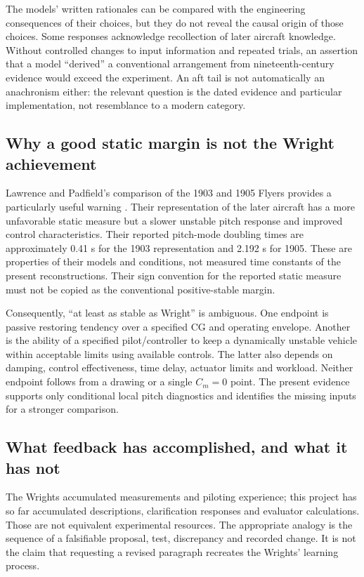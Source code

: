 \documentclass[11pt,a4paper]{article}
\begin{document}
The models' written rationales can be compared with the engineering consequences of their choices, but they do not reveal the causal origin of those choices. Some responses acknowledge recollection of later aircraft knowledge. Without controlled changes to input information and repeated trials, an assertion that a model ``derived'' a conventional arrangement from nineteenth-century evidence would exceed the experiment. An aft tail is not automatically an anachronism either: the relevant question is the dated evidence and particular implementation, not resemblance to a modern category.

\subsection{Why a good static margin is not the Wright achievement}
Lawrence and Padfield's comparison of the 1903 and 1905 Flyers provides a particularly useful warning \cite{ref10}. Their representation of the later aircraft has a more unfavorable static measure but a slower unstable pitch response and improved control characteristics. Their reported pitch-mode doubling times are approximately 0.41 s for the 1903 representation and 2.192 s for 1905. These are properties of their models and conditions, not measured time constants of the present reconstructions. Their sign convention for the reported static measure must not be copied as the conventional positive-stable margin.

Consequently, ``at least as stable as Wright'' is ambiguous. One endpoint is passive restoring tendency over a specified CG and operating envelope. Another is the ability of a specified pilot/controller to keep a dynamically unstable vehicle within acceptable limits using available controls. The latter also depends on damping, control effectiveness, time delay, actuator limits and workload. Neither endpoint follows from a drawing or a single $C_m=0$ point. The present evidence supports only conditional local pitch diagnostics and identifies the missing inputs for a stronger comparison.

\subsection{What feedback has accomplished, and what it has not}
The Wrights accumulated measurements and piloting experience; this project has so far accumulated descriptions, clarification responses and evaluator calculations. Those are not equivalent experimental resources. The appropriate analogy is the sequence of a falsifiable proposal, test, discrepancy and recorded change. It is not the claim that requesting a revised paragraph recreates the Wrights' learning process.
\end{document}
